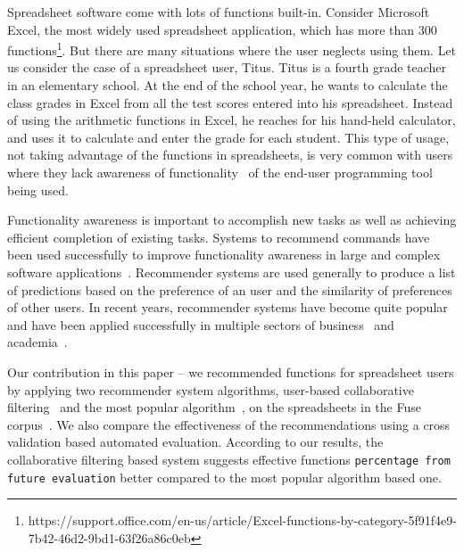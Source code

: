\documentclass[conference]{IEEEtran}
\begin{document}
Spreadsheet software come with lots of functions built-in. Consider Microsoft Excel, the most widely used spreadsheet application, which has more than 300 functions\footnote{https://support.office.com/en-us/article/Excel-functions-by-category-5f91f4e9-7b42-46d2-9bd1-63f26a86c0eb}. But there are many situations where the user neglects using them. Let us consider the case of a spreadsheet user, Titus. Titus is a fourth grade teacher in an elementary school. At the end of the school year, he wants to calculate the class grades in Excel from all the test scores entered into his spreadsheet. Instead of using the arithmetic functions in Excel, he reaches for his hand-held calculator, and uses it to calculate and enter the grade for each student. This type of usage, not taking advantage of the functions in spreadsheets, is very common with users where they lack awareness of functionality~\cite{grossman2009survey} of the end-user programming tool being used.

Functionality awareness is important to accomplish new tasks as well as achieving efficient completion of existing tasks. Systems to recommend commands have been used successfully to improve functionality awareness in large and complex software applications~\cite{matejka2009communitycommands,murphy2012improving}. Recommender systems are used generally to produce a list of predictions based on the preference of an user and the similarity of preferences of other users. In recent years, recommender systems have become quite popular and have been applied successfully in multiple sectors of business~\cite{linden2003amazon} and academia~\cite{hsu2008personalized,mcnee2006don}. 

Our contribution in this paper -- we recommended functions for spreadsheet users by applying two recommender system algorithms, user-based collaborative filtering~\cite{hill1995recommending} and the most popular algorithm~\cite{linton2000owl}, on the spreadsheets in the Fuse corpus~\cite{barik2015fuse}. We also compare the effectiveness of the recommendations using a cross validation based automated evaluation. According to our results, the collaborative filtering based system suggests effective functions \texttt{percentage from future evaluation} better compared to the most popular algorithm based one.
\end{document}
